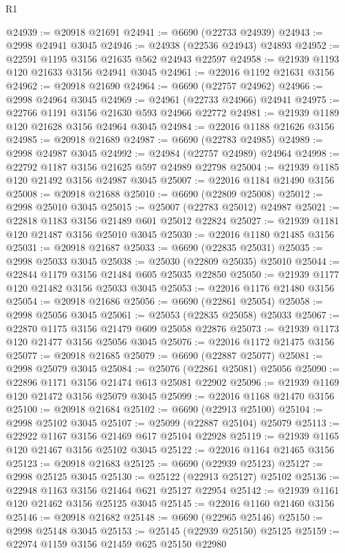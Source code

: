 \begin{lexlean}{R1}
\begin{coremodule}
@24939 := @20918 @21691
@24941 := @6690 (@22733 @24939)
@24943 := @2998 @24941 @3045
@24946 := @24938 (@22536 @24943) @24893
@24952 := @22591 @1195 @3156 @21635 @562 @24943 @22597
@24958 := @21939 @1193 @120 @21633 @3156 @24941 @3045
@24961 := @22016 @1192 @21631 @3156
@24962 := @20918 @21690
@24964 := @6690 (@22757 @24962)
@24966 := @2998 @24964 @3045
@24969 := @24961 (@22733 @24966) @24941
@24975 := @22766 @1191 @3156 @21630 @593 @24966 @22772
@24981 := @21939 @1189 @120 @21628 @3156 @24964 @3045
@24984 := @22016 @1188 @21626 @3156
@24985 := @20918 @21689
@24987 := @6690 (@22783 @24985)
@24989 := @2998 @24987 @3045
@24992 := @24984 (@22757 @24989) @24964
@24998 := @22792 @1187 @3156 @21625 @597 @24989 @22798
@25004 := @21939 @1185 @120 @21492 @3156 @24987 @3045
@25007 := @22016 @1184 @21490 @3156
@25008 := @20918 @21688
@25010 := @6690 (@22809 @25008)
@25012 := @2998 @25010 @3045
@25015 := @25007 (@22783 @25012) @24987
@25021 := @22818 @1183 @3156 @21489 @601 @25012 @22824
@25027 := @21939 @1181 @120 @21487 @3156 @25010 @3045
@25030 := @22016 @1180 @21485 @3156
@25031 := @20918 @21687
@25033 := @6690 (@22835 @25031)
@25035 := @2998 @25033 @3045
@25038 := @25030 (@22809 @25035) @25010
@25044 := @22844 @1179 @3156 @21484 @605 @25035 @22850
@25050 := @21939 @1177 @120 @21482 @3156 @25033 @3045
@25053 := @22016 @1176 @21480 @3156
@25054 := @20918 @21686
@25056 := @6690 (@22861 @25054)
@25058 := @2998 @25056 @3045
@25061 := @25053 (@22835 @25058) @25033
@25067 := @22870 @1175 @3156 @21479 @609 @25058 @22876
@25073 := @21939 @1173 @120 @21477 @3156 @25056 @3045
@25076 := @22016 @1172 @21475 @3156
@25077 := @20918 @21685
@25079 := @6690 (@22887 @25077)
@25081 := @2998 @25079 @3045
@25084 := @25076 (@22861 @25081) @25056
@25090 := @22896 @1171 @3156 @21474 @613 @25081 @22902
@25096 := @21939 @1169 @120 @21472 @3156 @25079 @3045
@25099 := @22016 @1168 @21470 @3156
@25100 := @20918 @21684
@25102 := @6690 (@22913 @25100)
@25104 := @2998 @25102 @3045
@25107 := @25099 (@22887 @25104) @25079
@25113 := @22922 @1167 @3156 @21469 @617 @25104 @22928
@25119 := @21939 @1165 @120 @21467 @3156 @25102 @3045
@25122 := @22016 @1164 @21465 @3156
@25123 := @20918 @21683
@25125 := @6690 (@22939 @25123)
@25127 := @2998 @25125 @3045
@25130 := @25122 (@22913 @25127) @25102
@25136 := @22948 @1163 @3156 @21464 @621 @25127 @22954
@25142 := @21939 @1161 @120 @21462 @3156 @25125 @3045
@25145 := @22016 @1160 @21460 @3156
@25146 := @20918 @21682
@25148 := @6690 (@22965 @25146)
@25150 := @2998 @25148 @3045
@25153 := @25145 (@22939 @25150) @25125
@25159 := @22974 @1159 @3156 @21459 @625 @25150 @22980

\end{coremodule}
\end{lexlean}
